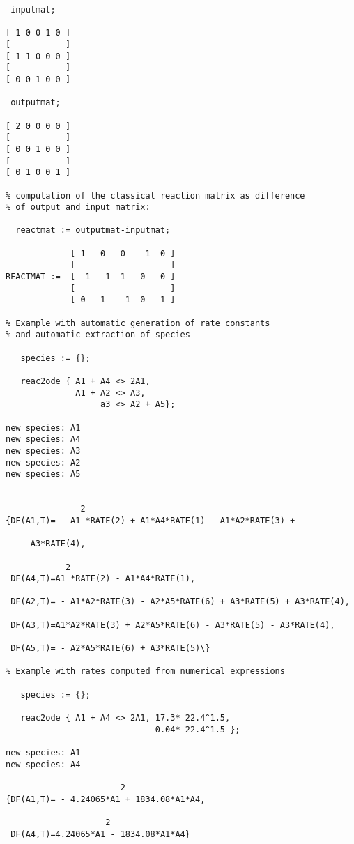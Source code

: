 \begin{verbatim}
 inputmat;

[ 1 0 0 1 0 ]
[           ]
[ 1 1 0 0 0 ]
[           ]
[ 0 0 1 0 0 ]

 outputmat;

[ 2 0 0 0 0 ]
[           ] 
[ 0 0 1 0 0 ] 
[           ] 
[ 0 1 0 0 1 ] 

% computation of the classical reaction matrix as difference
% of output and input matrix:

  reactmat := outputmat-inputmat;

             [ 1   0   0   -1  0 ]
             [                   ] 
REACTMAT :=  [ -1  -1  1   0   0 ] 
             [                   ] 
             [ 0   1   -1  0   1 ]

% Example with automatic generation of rate constants
% and automatic extraction of species

   species := {};

   reac2ode { A1 + A4 <> 2A1, 
              A1 + A2 <> A3,
                   a3 <> A2 + A5};

new species: A1
new species: A4
new species: A3
new species: A2
new species: A5


               2
{DF(A1,T)= - A1 *RATE(2) + A1*A4*RATE(1) - A1*A2*RATE(3) + 

     A3*RATE(4),

            2
 DF(A4,T)=A1 *RATE(2) - A1*A4*RATE(1),

 DF(A2,T)= - A1*A2*RATE(3) - A2*A5*RATE(6) + A3*RATE(5) + A3*RATE(4),

 DF(A3,T)=A1*A2*RATE(3) + A2*A5*RATE(6) - A3*RATE(5) - A3*RATE(4),

 DF(A5,T)= - A2*A5*RATE(6) + A3*RATE(5)\}

% Example with rates computed from numerical expressions

   species := {};

   reac2ode { A1 + A4 <> 2A1, 17.3* 22.4^1.5,
                              0.04* 22.4^1.5 };

new species: A1
new species: A4

                       2
{DF(A1,T)= - 4.24065*A1 + 1834.08*A1*A4,

                    2
 DF(A4,T)=4.24065*A1 - 1834.08*A1*A4}
\end{verbatim}